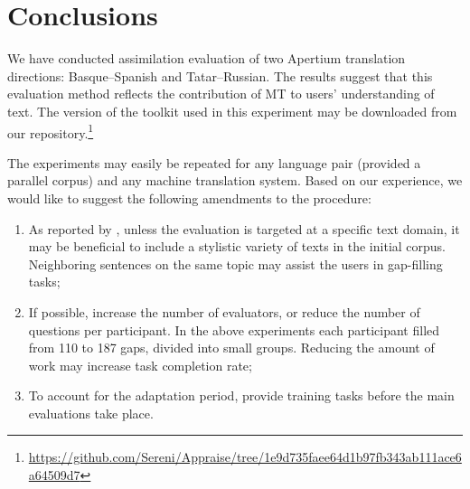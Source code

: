 \documentclass[11pt]{article}
\newcommand{\comment}[1]{}
\begin{document}

\section{Conclusions}
\label{sec:conclusion}
We have conducted assimilation evaluation of two Apertium translation directions: Basque--Spanish and Tatar--Russian. The results suggest that this evaluation method reflects the contribution of MT to users' understanding of text. The version of the toolkit used in this 
experiment may be downloaded from our repository.\footnote{{\url{https://github.com/Sereni/Appraise/tree/1e9d735faee64d1b97fb343ab111ace6a64509d7}}}

The experiments may easily be repeated for any language pair (provided a parallel corpus) and
any machine translation system. Based on our experience, we would like to suggest the following amendments to the procedure:
\begin{enumerate}
\item As reported by \cite{oregan13}, unless the evaluation is targeted at a specific text domain, it may be beneficial to include a stylistic variety of texts in the initial corpus. Neighboring sentences on the same topic may assist the users in gap-filling tasks;
\item If possible, increase the number of evaluators, or reduce the number of questions per participant. In the above experiments each participant filled from 110 to 187 gaps, divided into small groups. Reducing the amount of work may increase task completion rate;\comment{MLF's crazy idea: recaptchas?}\comment{EA: the participants did not leave the gaps empty, they just did not attempt the next portions of evaluation after finishing some and getting bored. or did I misunderstand the use of captchas? }
\item To account for the adaptation period, provide training tasks before the main evaluations take place.
\end{enumerate}
\end{document}
